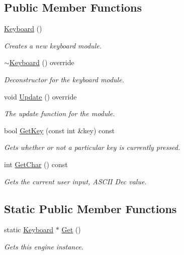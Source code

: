 \subsection*{Public Member Functions}
\begin{DoxyCompactItemize}
\item 
\hyperlink{class_flounder_1_1_keyboard_a724d7fe1f8ed1679205dd6c930591b98}{Keyboard} ()
\begin{DoxyCompactList}\small\item\em Creates a new keyboard module. \end{DoxyCompactList}\item 
\hyperlink{class_flounder_1_1_keyboard_adede9371069284614e104cf87b262f75}{$\sim$\+Keyboard} () override
\begin{DoxyCompactList}\small\item\em Deconstructor for the keyboard module. \end{DoxyCompactList}\item 
void \hyperlink{class_flounder_1_1_keyboard_afd33527c78a5ab2d75e9d9e2e1bc525e}{Update} () override
\begin{DoxyCompactList}\small\item\em The update function for the module. \end{DoxyCompactList}\item 
bool \hyperlink{class_flounder_1_1_keyboard_a96078e0aa8d147df2e0d9fdf2b74a667}{Get\+Key} (const int \&key) const
\begin{DoxyCompactList}\small\item\em Gets whether or not a particular key is currently pressed. \end{DoxyCompactList}\item 
int \hyperlink{class_flounder_1_1_keyboard_abe036a0e25d4df1af8cf642b7992128c}{Get\+Char} () const
\begin{DoxyCompactList}\small\item\em Gets the current user input, A\+S\+C\+II Dec value. \end{DoxyCompactList}\end{DoxyCompactItemize}
\subsection*{Static Public Member Functions}
\begin{DoxyCompactItemize}
\item 
static \hyperlink{class_flounder_1_1_keyboard}{Keyboard} $\ast$ \hyperlink{class_flounder_1_1_keyboard_a6a8b43b3a483b15155f1d6d90ceabced}{Get} ()
\begin{DoxyCompactList}\small\item\em Gets this engine instance. \end{DoxyCompactList}\end{DoxyCompactItemize}
